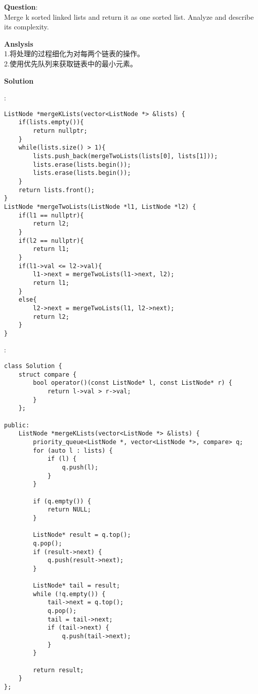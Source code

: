     
\begin{description}
    \item{\textbf{Question}}:\\%
		Merge k sorted linked lists and return it as one sorted list. Analyze and describe its complexity.

    \item{\textbf{Anslysis}}\\
		1.将处理的过程细化为对每两个链表的操作。\\
		2.使用优先队列来获取链表中的最小元素。
	
    \item{\textbf{Solution}}
	\item{} : \\
		\begin{lstlisting}
ListNode *mergeKLists(vector<ListNode *> &lists) {
    if(lists.empty()){
        return nullptr;
    }
    while(lists.size() > 1){
        lists.push_back(mergeTwoLists(lists[0], lists[1]));
        lists.erase(lists.begin());
        lists.erase(lists.begin());
    }
    return lists.front();
}
ListNode *mergeTwoLists(ListNode *l1, ListNode *l2) {
    if(l1 == nullptr){
        return l2;
    }
    if(l2 == nullptr){
        return l1;
    }
    if(l1->val <= l2->val){
        l1->next = mergeTwoLists(l1->next, l2);
        return l1;
    }
    else{
        l2->next = mergeTwoLists(l1, l2->next);
        return l2;
    }
}
		\end{lstlisting}

	\item{} : \\
		\begin{lstlisting}
class Solution {
    struct compare {
        bool operator()(const ListNode* l, const ListNode* r) {
            return l->val > r->val;
        }
    };

public:
    ListNode *mergeKLists(vector<ListNode *> &lists) {
        priority_queue<ListNode *, vector<ListNode *>, compare> q;
        for (auto l : lists) {
            if (l) {
                q.push(l);
            }
        }

        if (q.empty()) {
            return NULL;
        }

        ListNode* result = q.top();
        q.pop();
        if (result->next) {
            q.push(result->next);
        }

        ListNode* tail = result;            
        while (!q.empty()) {
            tail->next = q.top();
            q.pop();
            tail = tail->next;
            if (tail->next) {
                q.push(tail->next);
            }
        }

        return result;
    }
};
		\end{lstlisting}
\end{description}


